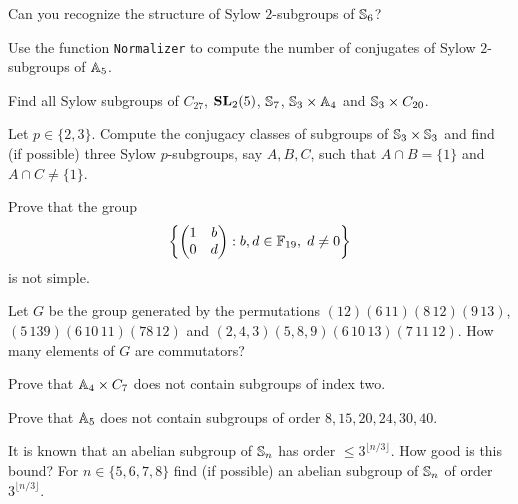 \begin{prob}
  Can you recognize the structure of Sylow $2$-subgroups of $\mathbb{S}_6$?
\end{prob}

\begin{prob}
  Use the function \lstinline{Normalizer} to compute the number of conjugates
  of Sylow $2$-subgroups of $\mathbb{A}_5$. 
\end{prob}

\begin{prob}
    Find all Sylow subgroups of $C_{27}$, $\mathbf{SL}_2(5)$,
    $\mathbb{S}_7$, $\mathbb{S}_3\times\mathbb{A}_4$ and $\mathbb{S}_3\times C_{20}$. 
\end{prob}

\begin{prob}
    Let $p\in\{2,3\}$. 
  Compute the conjugacy classes of subgroups of $\mathbb{S}_3\times\mathbb{S}_3$ and find
  (if possible) 
  three Sylow $p$-subgroups, say $A,B,C$, such that $A\cap B=\{1\}$ and $A\cap
  C\ne\{1\}$.
\end{prob}

\begin{prob}
    Prove that the group
    \[
        \left\{\begin{pmatrix}
            1&b\\
            0&d
        \end{pmatrix}
        :b,d\in\mathbb{F}_{19},\;d\ne0
        \right\}
    \]
    is not simple.
\end{prob}

\begin{prob}
    Let $G$ be the group generated by the permutations 
    $(12)(6\,11)(8\,12)(9\,13)$, $(5\,139)(6\,10\,11)(78\,12)$ and 
    $(2,4,3)(5,8,9)(6\,10\,13)(7\,11\,12)$. 
    How many elements of $G$ are commutators?
\end{prob}

\begin{prob}
Prove that $\mathbb{A}_4\times C_7$ does not contain subgroups of index two.
\end{prob}

\begin{prob}
  \label{prob:A5:8,15,20,24,30,49}
  Prove that $\mathbb{A}_5$ does not contain subgroups of order $8,15,20,24,30,40$. 
\end{prob}

\begin{prob}
  It is known that an abelian subgroup of $\mathbb{S}_n$ has order
  $\leq3^{\lfloor n/3\rfloor}$. How good is this bound? For
  $n\in\{5,6,7,8\}$ find (if possible) an abelian subgroup of $\mathbb{S}_n$ of
  order $3^{\lfloor n/3\rfloor}$. 
\end{prob}

